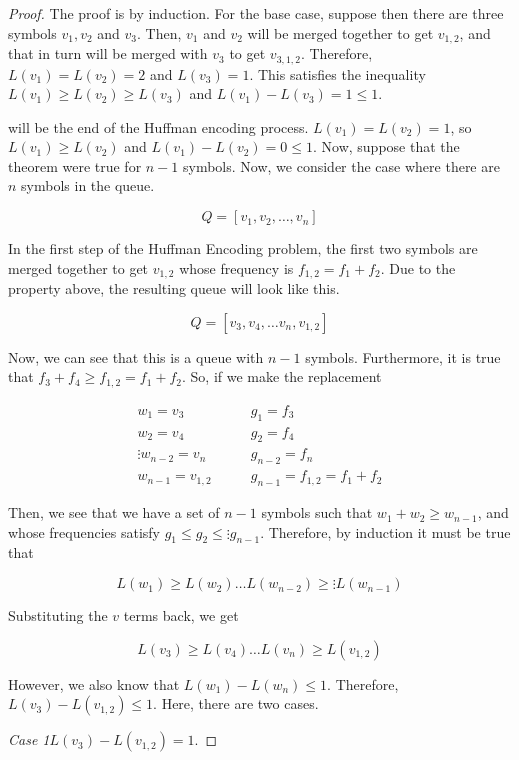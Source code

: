 \documentclass{article}
\begin{document}
\begin{proof}
	The proof is by induction. For the base case, suppose then there are three symbols $v_1, v_2$ and $v_3$. Then, $v_1$ and $v_2$ will be merged together to get $v_{1,2}$, and that in turn will be merged with $v_3$ to get $v_{3,1,2}$. Therefore, $L(v_1) = L(v_2) = 2$ and $L(v_3) = 1$. This satisfies the inequality $L(v_1) \geq L(v_2) \geq L(v_3)$ and $L(v_1) - L(v_3) = 1 \leq 1$. 


  will be the end of the Huffman encoding process. $L(v_1) = L(v_2) = 1$, so $L(v_1) \geq L(v_2)$ and $L(v_1) - L(v_2) = 0 \leq 1$.
Now, suppose that the theorem were true for $n-1$ symbols. Now, we consider the case where there are $n$ symbols in the queue.

$$
Q = \left[ v_1, v_2, \ldots, v_n \right]
$$ 

In the first step of the Huffman Encoding problem, the first two symbols are merged together to get $v_{1, 2}$ whose frequency is $f_{1,2} = f_1 + f_2$. Due to the property above, the resulting queue will look like this.

$$
Q = \left[ v_3, v_4, \ldots v_n, v_{1,2} \right]
$$

Now, we can see that this is a queue with $n-1$ symbols. Furthermore, it is true that $f_3 + f_4 \geq f_{1,2} = f_1 + f_2$. So, if we make the replacement

\begin{align*}
	w_1 = v_3 &\qquad g_1 = f_3\\
	w_2 = v_4 &\qquad g_2 = f_4\\
	\vdots
	w_{n-2} = v_n &\qquad g_{n-2} = f_n\\
	w_{n-1} = v_{1,2} &\qquad g_{n-1} = f_{1,2} = f_1 + f_2	
\end{align*}

Then, we see that we have a set of $n-1$ symbols such that $w_1 + w_2 \geq w_{n-1}$, and whose frequencies satisfy $g_1 \leq g_2 \leq \vdots g_{n-1}$. Therefore, by induction it must be true that 

$$
L(w_1) \geq L(w_2) \ldots L(w_{n-2}) \geq \vdots L(w_{n-1})
$$

Substituting the $v$ terms back, we get

$$
L(v_3) \geq L(v_4) \ldots L(v_n) \geq L(v_{1,2})
$$

However, we also know that $L(w_1) - L(w_n) \leq 1$. Therefore, $L(v_3) - L(v_{1,2}) \leq 1$. Here, there are two cases.

\textit{Case 1}$L(v_3) - L(v_{1,2}) = 1$.


\end{proof}
\end{document}
